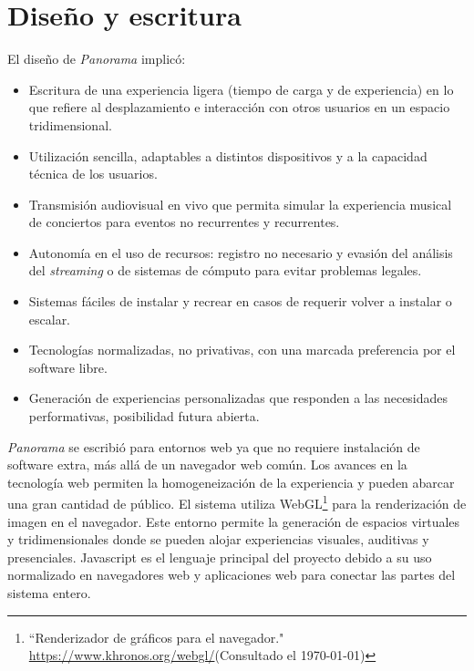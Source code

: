 
\section*{Diseño y escritura} %

El diseño de \textit{Panorama} implicó:

\begin{itemize}
\item Escritura de una experiencia ligera (tiempo de carga y de experiencia) en lo que refiere al desplazamiento e interacción con otros usuarios en un espacio tridimensional. 
\item Utilización sencilla, adaptables a distintos dispositivos y a la capacidad técnica de los usuarios.
\item Transmisión audiovisual en vivo que permita simular la experiencia musical de conciertos para eventos no recurrentes y recurrentes. 
\item Autonomía en el uso de recursos: registro no necesario y evasión del análisis del \textit{streaming} o de sistemas de cómputo para evitar problemas legales. 
\item Sistemas fáciles de instalar y recrear en casos de requerir volver a instalar o escalar.
\item Tecnologías normalizadas, no privativas, con una marcada preferencia por el software libre.
\item Generación de experiencias personalizadas que responden a las necesidades performativas, posibilidad futura abierta. 
\end{itemize}

\textit{Panorama} se escribió para entornos web ya que no requiere instalación de software extra, más allá de un navegador web común. Los avances en la tecnología web permiten la homogeneización de la experiencia y pueden abarcar una gran cantidad de público. El sistema utiliza WebGL\footnote{``Renderizador de gráficos para el navegador." \url{https://www.khronos.org/webgl/}(Consultado el \today)} para la renderización de imagen en el navegador. Este entorno permite la generación de espacios virtuales y tridimensionales donde se pueden alojar experiencias visuales, auditivas y presenciales. Javascript es el lenguaje principal del proyecto debido a su uso normalizado en navegadores web y aplicaciones web para conectar las partes del sistema entero.

